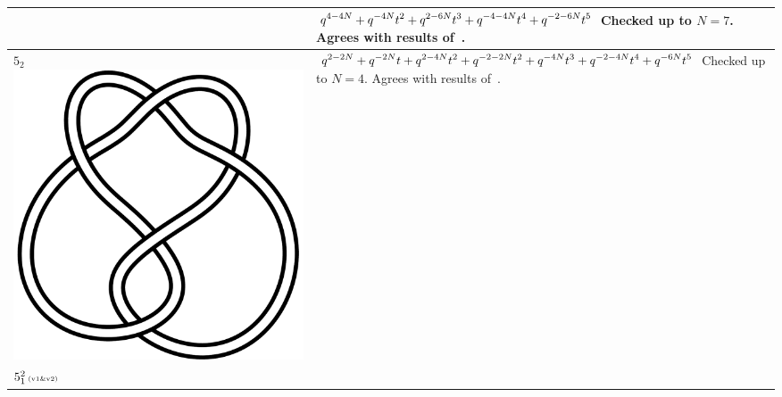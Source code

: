 \documentclass{compositio}
\theoremstyle{definition}
\numberwithin{equation}{section}
\begin{document}
{\begin{longtable}{p{}|p{}}
& 
$
\displaystyle{%
q^{4 - 4 N} + q^{-4 N} t^2 + q^{2 - 6 N} t^3 + q^{-4 - 4 N} t^4 +  q^{-2 - 6 N} t^5
}
$
\newline\newline\newline\newline
Checked up to $N=7$. Agrees with results of~\cite{r0508510, r0607544}. 
\\
\hline
$5_{2}$ 
\includegraphics[scale=0.07,angle=0]{knot5_2.pdf} 
& 
$
\displaystyle{%
q^{2 - 2 N} + q^{-2 N} t + q^{2 - 4 N} t^2 + q^{-2 - 2 N} t^2 + q^{-4 N} t^3 + q^{-2 - 4 N} t^4 + q^{-6 N} t^5
}
$
\newline\newline\newline\newline
Checked up to $N=4$. Agrees with results of~\cite{r0508510, r0607544}. 
\\
\hline
$5_{1}^2\,\text{{\tiny (v1\&v2)}}$ 

\end{longtable}}
\end{document}
